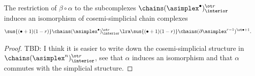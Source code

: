 \begin{proposition}\label{lemma:bartomilnor}
	The restriction of $\beta\circ \alpha$ to the subcomplexes  $\chains(\asimplex^{\bullet})^{\ot r}_\interior$ induces an isomorphism of cosemi-simplicial chain complexes
	\[
	\sus{(\bullet+1)(1-r)}\chains(\asimplex^{\bullet})^{\ot r}_\interior
	\lra 
	\sus{(\bullet+1)(1-r)}\chains(\partial\asimplex^{r-1})^{\ot \bullet+1}.
	\]
\end{proposition}
\begin{proof}
	TBD: I think it is easier to write down the cosemi-simplicial structure in $\chains(\asimplex^{n})^{\ot r}_\interior$, see that $\alpha$ induces an isomorphism and that $\alpha$ commutes with the simplicial structure.
\end{proof}
